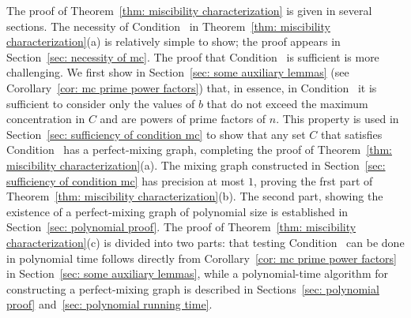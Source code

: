 The proof of Theorem~\ref{thm: miscibility characterization}
is given in several sections. The necessity of Condition~{\MixCond} in 
Theorem~\ref{thm: miscibility characterization}(a)
is relatively simple to show; the proof appears in Section~\ref{sec: necessity of mc}. 
The proof that Condition~{\MixCond} is sufficient is more challenging. We first
show in Section~\ref{sec: some auxiliary lemmas} (see Corollary~\ref{cor: mc prime power factors})
that, in essence, in Condition~{\MixCond} it is sufficient to consider only
the values of $b$ that do not exceed the maximum concentration in $C$ and
are powers of prime factors of $n$.
This property is used in Section~\ref{sec: sufficiency of condition mc}
to show that any set $C$ that satisfies Condition~{\MixCond} has 
a perfect-mixing graph, completing the proof of Theorem~\ref{thm: miscibility characterization}(a).
The mixing graph constructed in Section~\ref{sec: sufficiency of condition mc} 
has precision at most $1$, proving the frst part of Theorem~\ref{thm: miscibility characterization}(b).
The second part, showing the existence of a perfect-mixing graph of polynomial
size is established in Section~\ref{sec: polynomial proof}.
The proof of Theorem~\ref{thm: miscibility characterization}(c) is divided into
two parts: that testing Condition~{\MixCond} can be done in polynomial
time follows directly from Corollary~\ref{cor: mc prime power factors} 
in Section~\ref{sec: some auxiliary lemmas}, while a polynomial-time 
algorithm for constructing a perfect-mixing graph is described
in Sections~\ref{sec: polynomial proof} and~\ref{sec: polynomial running time}.

